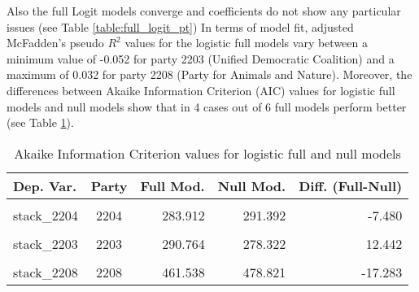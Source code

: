 \documentclass[
]{article}
\begin{document}
Also the full Logit models converge and coefficients do not show any particular issues (see Table \ref{table:full_logit_pt})
In terms of model fit, adjusted McFadden's pseudo \(R^2\) values for the logistic full models vary between
a minimum value of
-0.052
for party 2203
(Unified Democratic Coalition)
and a maximum of
0.032
for party 2208
(Party for Animals and Nature).
Moreover, the differences between Akaike Information Criterion (AIC) values for logistic full models and
null models show that in 4 cases out of 6 full models perform better (see Table
\ref{table:logit_aic_pt}).

\begin{table}[!h]

\caption{\label{tab:unnamed-chunk-145}Akaike Information Criterion values for logistic full and null models 
        \label{table:logit_aic_pt}}
\centering
\begin{tabular}[t]{lcrrr}
\toprule
Dep. Var. & Party & Full Mod. & Null Mod. & Diff. (Full-Null)\\
\midrule
\cellcolor{gray!6}{stack\_2202} & \cellcolor{gray!6}{2202} & \cellcolor{gray!6}{556.232} & \cellcolor{gray!6}{573.650} & \cellcolor{gray!6}{-17.419}\\
stack\_2204 & 2204 & 283.912 & 291.392 & -7.480\\
\cellcolor{gray!6}{stack\_2201} & \cellcolor{gray!6}{2201} & \cellcolor{gray!6}{847.996} & \cellcolor{gray!6}{873.875} & \cellcolor{gray!6}{-25.879}\\
stack\_2203 & 2203 & 290.764 & 278.322 & 12.442\\
\cellcolor{gray!6}{stack\_2206} & \cellcolor{gray!6}{2206} & \cellcolor{gray!6}{598.693} & \cellcolor{gray!6}{582.534} & \cellcolor{gray!6}{16.159}\\
\addlinespace
stack\_2208 & 2208 & 461.538 & 478.821 & -17.283\\
\bottomrule
\end{tabular}
\end{table}
\end{document}
